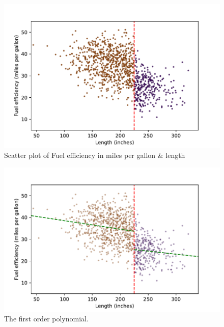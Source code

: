 \documentclass{article}
\begin{document}
\begin{figure}[h!]
    \centering
    \includegraphics{homework 7/output/figure/scatterplot1.pdf}
    \caption{Scatter plot of Fuel efficiency in miles per gallon \& length}
    \label{fig:scatterplot1}
\end{figure}


\begin{figure}[h!]
    \centering
    \includegraphics{homework 7/output/figure/scatterplot2.pdf}
    \caption{The first order polynomial.}
    \label{fig:scatterplot2}
\end{figure}
\end{document}
